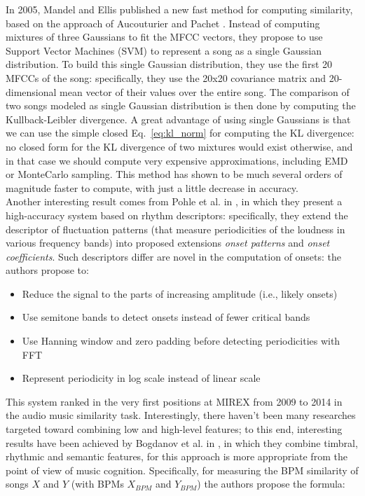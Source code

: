 In 2005, Mandel and Ellis published a new fast method for computing similarity, based on the approach of Aucouturier and Pachet \cite{mandel05}. Instead of computing mixtures of three Gaussians to fit the MFCC vectors, they propose to use Support Vector Machines (SVM) to represent a song as a single Gaussian distribution. To build this single Gaussian distribution, they use the first 20 MFCCs of the song: specifically, they use the 20x20 covariance matrix and 20-dimensional mean vector of their values over the entire song. The comparison of two songs modeled as single Gaussian distribution is then done by computing the Kullback-Leibler divergence. A great advantage of using single Gaussians is that we can use the simple closed Eq.~\ref{eq:kl_norm} for computing the KL divergence: no closed form for the KL divergence of two mixtures would exist otherwise, and in that case we should compute very expensive approximations, including EMD or MonteCarlo sampling. This method has shown to be much several orders of magnitude faster to compute, with just a little decrease in accuracy. \\ Another interesting result comes from Pohle et al. in \cite{pohle09}, in which they present a high-accuracy system based on rhythm descriptors: specifically, they extend the descriptor of fluctuation patterns (that measure periodicities of the loudness in various frequency bands) into proposed extensions \textit{onset patterns} and \textit{onset coefficients}. Such descriptors differ are novel in the computation of onsets: the authors propose to: 
\begin{itemize}
\item Reduce the signal to the parts of increasing amplitude (i.e., likely onsets)
\item Use semitone bands to detect onsets instead of fewer critical bands
\item Use Hanning window and zero padding before detecting periodicities with FFT
\item Represent periodicity in log scale instead of linear scale
\end{itemize}
This system ranked in the very first positions at MIREX from 2009 to 2014 in the audio music similarity task.  
Interestingly, there haven't been many researches targeted toward combining low and high-level features; to this end, interesting results have been achieved by Bogdanov et al. in \cite{dimi10}, in which they combine timbral, rhythmic and semantic features, for this approach is more appropriate from the point of view of music cognition. Specifically, for measuring the BPM similarity of songs $X$ and $Y$ (with BPMs $X_{BPM}$ and $Y_{BPM}$) the authors propose the formula:
